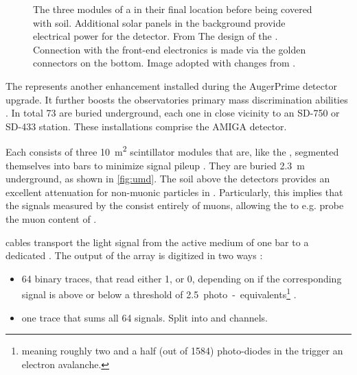 \begin{figure}[t]
  \centering
  \hspace{0.2cm}
  \caption[]{The three modules of a \UMD in their final location
  before being covered with soil. Additional solar panels in the background
  provide electrical power for the detector. From 
  \cite{pierreaugercollaborationUMDUndergroundMuon}  The \PCB
  design of the \UUB. Connection with the front-end electronics is made via the
  golden connectors on the bottom. Image adopted with changes from 
\cite{nitzNewElectronicsSurface2021}.}
  \label{fig:umd-and-uub}
\end{figure}


The \UMD represents another enhancement installed during the AugerPrime detector
upgrade. It further boosts the observatories primary mass discrimination 
abilities \cite{collaborationPierreAugerObservatory2016}. In total 73 \UMDs are
buried underground, each one in close vicinity to an SD-750 or SD-433 station. 
These installations comprise the \acf{AMIGA} detector.

Each \UMD consists of three \SI{10}{\meter\squared} scintillator modules that 
are, like the \SSD, segmented themselves into bars to minimize signal pileup
\cite{bottiStatusPerformanceUnderground2022}. They are buried \SI{2.3}{\meter} 
underground, as shown in \cref{fig:umd}. The soil above the detectors provides 
an excellent attenuation for non-muonic particles in \EASs. Particularly, this 
implies that the signals measured by the \UMD consist entirely of muons, 
allowing the \PAO to e.g. probe the muon content of \EASs {}.

\WLS cables transport the light signal from the active medium of one bar to a 
dedicated \SiPM. The output of the \SiPM array is digitized in two ways 
\cite{aabCalibrationUndergroundMuon2021}:

\begin{itemize}
	\item 64 binary traces, that read either 1, or 0, depending on if the 
	corresponding \SiPM signal is above or below a threshold of 
	\SI{2.5}{photo-equivalents}\footnote{meaning roughly two and a half
	(out of 1584) photo-diodes in the \SiPM trigger an electron avalanche.}
	\cite{bottiStatusPerformanceUnderground2022}.
	\item one \ADC trace that sums all 64 \SiPM signals. Split into \HG and
	\LG channels.
\end{itemize}

